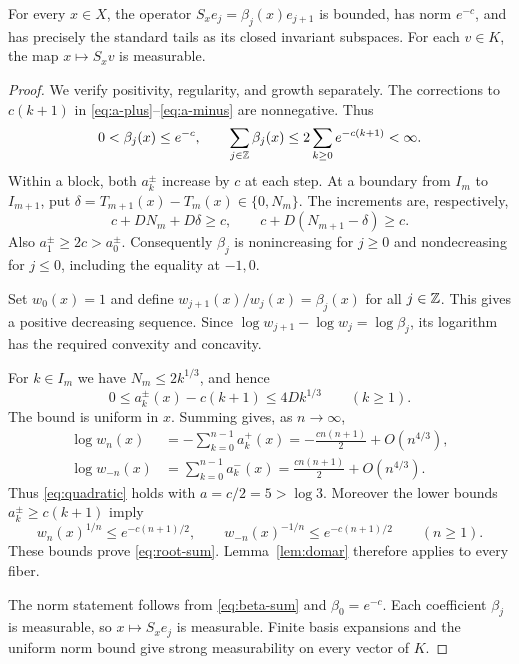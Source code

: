 \begin{proposition}\label{prop:fibers}
For every $x\in X$, the operator $S_xe_j=\beta_j(x)e_{j+1}$ is bounded, has norm $e^{-c}$, and has precisely the standard tails as its closed invariant subspaces. For each $v\in K$, the map $x\mapsto S_xv$ is measurable.
\end{proposition}
\begin{proof}
We verify positivity, regularity, and growth separately. The corrections to $c(k+1)$ in \eqref{eq:a-plus}--\eqref{eq:a-minus} are nonnegative. Thus
\begin{equation}\label{eq:beta-sum}
 0<\beta_j(x)\le e^{-c},\qquad
 \sum_{j\in\mathbb Z}\beta_j(x)\le2\sum_{k\ge0}e^{-c(k+1)}<\infty.
\end{equation}
Within a block, both $a_k^\pm$ increase by $c$ at each step. At a boundary from $I_m$ to $I_{m+1}$, put $\delta=T_{m+1}(x)-T_m(x)\in\{0,N_m\}$. The increments are, respectively,
\[
 c+DN_m+D\delta\ge c,
 \qquad c+D(N_{m+1}-\delta)\ge c.
\]
Also $a_1^\pm\ge2c>a_0^\pm$. Consequently $\beta_j$ is nonincreasing for $j\ge0$ and nondecreasing for $j\le0$, including the equality at $-1,0$.

Set $w_0(x)=1$ and define $w_{j+1}(x)/w_j(x)=\beta_j(x)$ for all $j\in\mathbb Z$. This gives a positive decreasing sequence. Since $\log w_{j+1}-\log w_j=\log\beta_j$, its logarithm has the required convexity and concavity.

For $k\in I_m$ we have $N_m\le2k^{1/3}$, and hence
\begin{equation}\label{eq:a-error}
 0\le a_k^\pm(x)-c(k+1)\le4Dk^{1/3}\qquad(k\ge1).
\end{equation}
The bound is uniform in $x$. Summing gives, as $n\to\infty$,
\begin{align}
 \log w_n(x)&=-\sum_{k=0}^{n-1}a_k^+(x)
   =-\frac{cn(n+1)}2+O(n^{4/3}),\label{eq:w-positive}\\
 \log w_{-n}(x)&=\sum_{k=0}^{n-1}a_k^-(x)
   =\frac{cn(n+1)}2+O(n^{4/3}).\label{eq:w-negative}
\end{align}
Thus \eqref{eq:quadratic} holds with $a=c/2=5>\log3$. Moreover the lower bounds $a_k^\pm\ge c(k+1)$ imply
\[
 w_n(x)^{1/n}\le e^{-c(n+1)/2},\qquad
 w_{-n}(x)^{-1/n}\le e^{-c(n+1)/2}\qquad(n\ge1).
\]
These bounds prove \eqref{eq:root-sum}. Lemma~\ref{lem:domar} therefore applies to every fiber.

The norm statement follows from \eqref{eq:beta-sum} and $\beta_0=e^{-c}$. Each coefficient $\beta_j$ is measurable, so $x\mapsto S_xe_j$ is measurable. Finite basis expansions and the uniform norm bound give strong measurability on every vector of $K$.
\end{proof}

